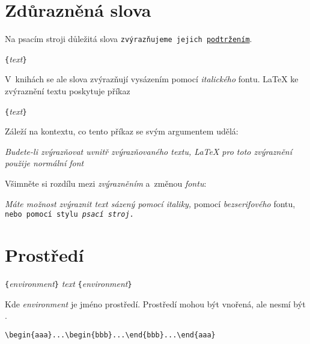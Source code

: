 \section{Zdůrazněná slova}

Na psacím stroji důležitá slova \texttt{zvýrazňujeme jejich \underline{podtržením}}.
\begin{lscommand}
\verb|{|\emph{text}\verb|}|
\end{lscommand}
V~knihách se ale slova zvýrazňují vysázením pomocí \emph{italického} fontu.
\LaTeX{} ke zvýraznění textu poskytuje příkaz
\begin{lscommand}
\verb|{|\emph{text}\verb|}|
\end{lscommand}
\noindent Záleží na kontextu, co tento příkaz se svým argumentem udělá:

\begin{example}
\emph{Budete-li
  zvýrazňovat uvnitř
  zvýrazňovaného textu,
  \LaTeX{} pro toto
  zvýraznění použije
  \emph{normální} font}
\end{example}

Všimněte si rozdílu mezi \emph{zvýrazněním} a~změnou \emph{fontu}:

\begin{example}
\textit{Máte možnost
  \emph{zvýraznit} text
  sázený pomocí italiky,} 
\textsf{pomocí
  \emph{bezserifového} fontu,}
\texttt{nebo pomocí
  stylu \emph{psací stroj}.}
\end{example}

\section{Prostředí} \label{env}

\begin{lscommand}
\verb|{|\emph{environment}\verb|}|\quad
   \emph{text}\quad
{}\verb|{|\emph{environment}\verb|}|
\end{lscommand}
\noindent Kde \emph{environment} je jméno prostředí. Prostředí mohou být
vnořená, ale nesmí být .
\begin{code}
\verb|\begin{aaa}...\begin{bbb}...\end{bbb}...\end{aaa}|
\end{code}


